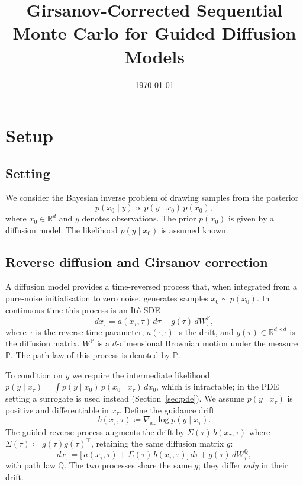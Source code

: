 \documentclass[11pt]{article}
\newcommand{\bbP}{\mathbb{P}}
\newcommand{\bbQ}{\mathbb{Q}}
\newcommand{\R}{\mathbb{R}}
\begin{document}
\title{Girsanov-Corrected Sequential Monte Carlo for Guided Diffusion Models}
\author{}
\date{\today}
\maketitle

\section{Setup}

\subsection{Setting}

We consider the Bayesian inverse problem of drawing samples from the posterior
\begin{equation}\label{eq:posterior}
  p(x_0 \mid y) \propto p(y \mid x_0)\,p(x_0),
\end{equation}
where $x_0 \in \R^d$ and $y$ denotes observations.
The prior $p(x_0)$ is given by a diffusion model.
The likelihood $p(y \mid x_0)$ is assumed known.

\subsection{Reverse diffusion and Girsanov correction}

A diffusion model provides a time-reversed process that, when integrated from a pure-noise
initialisation to zero noise, generates samples $x_0 \sim p(x_0)$.
In continuous time this process is an It\^o SDE
\begin{equation}\label{eq:sde-unguided}
  dx_\tau = a(x_\tau, \tau)\,d\tau + g(\tau)\,dW^{\bbP}_\tau,
\end{equation}
where $\tau$ is the reverse-time parameter, $a(\cdot,\cdot)$ is the drift, and
$g(\tau) \in \R^{d\times d}$ is the diffusion matrix.
$W^{\bbP}$ is a $d$-dimensional Brownian motion under the measure $\bbP$.
The path law of this process is denoted by $\bbP$.

To condition on $y$ we require the intermediate likelihood
$p(y \mid x_\tau) = \int p(y \mid x_0)\,p(x_0 \mid x_\tau)\,dx_0$, which is intractable;
in the PDE setting a surrogate is used instead (Section~\ref{sec:pde}).
We assume $p(y \mid x_\tau)$ is positive and differentiable in $x_\tau$.
Define the guidance drift
\begin{equation}\label{eq:guidance-drift}
  b(x_\tau, \tau) \coloneqq \nabla_{x_\tau}\!\log p(y \mid x_\tau).
\end{equation}
The guided reverse process augments the drift by $\Sigma(\tau)\,b(x_\tau,\tau)$
where $\Sigma(\tau) \coloneqq g(\tau)g(\tau)^\top$, retaining the same diffusion
matrix $g$:
\begin{equation}\label{eq:sde-guided}
  dx_\tau = \bigl[\,a(x_\tau, \tau) + \Sigma(\tau)\,b(x_\tau, \tau)\bigr]\,d\tau
            + g(\tau)\,dW^{\bbQ}_\tau,
\end{equation}
with path law $\bbQ$.
The two processes share the same $g$; they differ \emph{only} in their drift.
\end{document}
